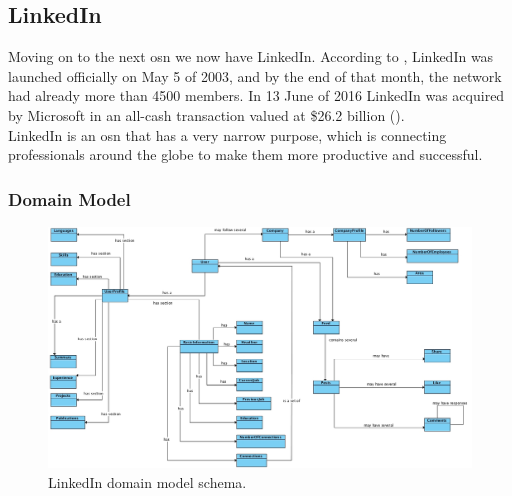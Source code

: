 \subsection{LinkedIn}

Moving on to the next \gls{osn} we now have LinkedIn. According to \cite{linkabout}, LinkedIn was launched officially on May 5 of 2003, and by the end of
that month, the network had already more than 4500 members. In 13 June of 2016 LinkedIn was acquired by Microsoft in an all-cash transaction valued at \$26.2
billion (\cite{microlink}).\\
\indent LinkedIn is an \gls{osn} that has a very narrow purpose, which is
connecting professionals around the globe to make them more productive and successful.

\subsubsection*{Domain Model}

\begin{figure}[h!]
  \hspace*{-1in}
  \includegraphics[width=1.20\textwidth]{img/linkedin-domain-model.jpg}
\caption{\label{img:linkdomain} LinkedIn domain model schema.}
\end{figure}

